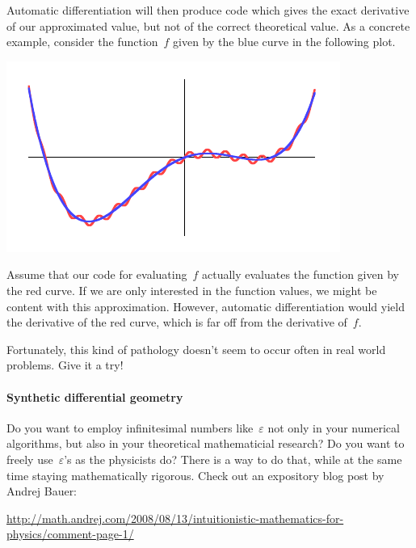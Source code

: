 \documentclass[a4paper,ngerman,12pt]{scrartcl}
\theoremstyle{definition}
\theoremstyle{plain}
\theoremstyle{remark}
\begin{document}
Automatic differentiation will then produce code which gives the exact
derivative of our approximated value, but not of the correct theoretical value.
As a concrete example, consider the function~$f$ given by the blue curve in the
following plot.
\begin{center}\includegraphics{consistency-error}\end{center}
Assume that our code for evaluating~$f$ actually evaluates the function given
by the red curve. If we are only interested in the function values, we might be
content with this approximation. However, automatic differentiation would yield
the derivative of the red curve, which is far off from the derivative of~$f$.

Fortunately, this kind of pathology doesn't seem to occur often in real world
problems. Give it a try!

\paragraph{Synthetic differential geometry} Do you want to employ infinitesimal
numbers like~$\varepsilon$ not only in your numerical algorithms, but also in
your theoretical mathematicial research? Do you want to freely
use~$\varepsilon$'s as the physicists do? There is a way to do that, while at
the same time staying mathematically rigorous. Check out an expository
blog post by Andrej Bauer:

\begin{center}\small\url{http://math.andrej.com/2008/08/13/intuitionistic-mathematics-for-physics/comment-page-1/}\end{center}
\end{document}
